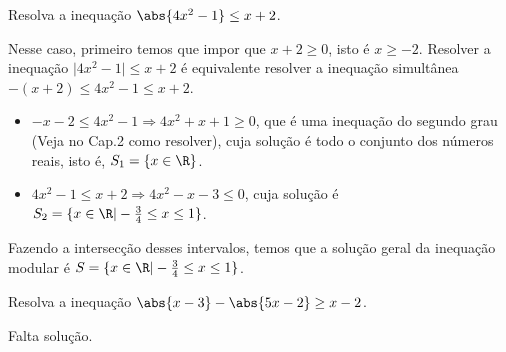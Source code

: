 \begin{example}
  Resolva a inequação \(\abs{4x^2-1} \leq x+2\).

  \solution
  Nesse caso, primeiro temos que impor que $x+2 \geq 0$, isto é $x \geq -2$.
  Resolver a inequação $\vert 4x^2-1 \vert \leq x+2$ é equivalente resolver a
  inequação simultânea $-(x+2) \leq 4x^2-1 \leq x+2$.
  \begin{itemize}
      \item[1.] $-x-2 \leq 4x^2-1 \Rightarrow 4x^2+x+1 \geq 0$, que é uma
        inequação do segundo grau (Veja no Cap.2 como resolver), cuja solução
        é todo o conjunto dos números reais, isto é, $S_1= \{ x \in
        \R \}$.

      \item[2.] $4x^2-1 \leq x+2 \Rightarrow 4x^2-x-3 \leq 0$, cuja
        solução é $S_2= \{ x \in \R| -\frac{3}{4} \leq x \leq 1 \}$.
  \end{itemize}
  Fazendo a intersecção desses intervalos, temos que a solução geral da
  inequação modular é $S=\{ x \in \R | -\frac{3}{4} \leq x \leq 1
  \}$.
\end{example}

\begin{example}
  Resolva a inequação \(\abs{x-3} - \abs{5x-2} \geq x-2\).

  \solution
  {\large\color{red} Falta solução.}
\end{example}

